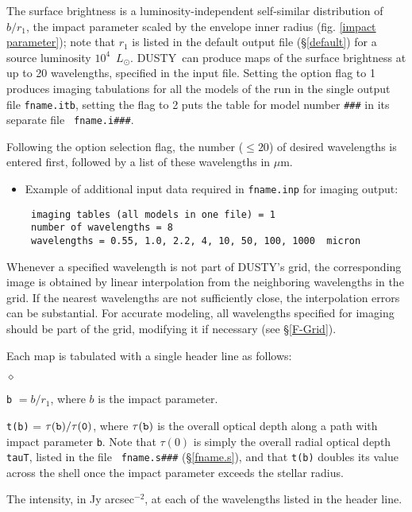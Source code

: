 \documentclass[12pt]{article} \usepackage{epsf}
\def\D  {{\sf DUSTY}}
\def\E#1{\hbox{$10^{#1}$}}
\def\mic    {\hbox{$\mu$m}}
\def\Lo     {\hbox{$L_{\odot}$}}
\begin{document}
The surface brightness is a luminosity-independent self-similar distribution
\cite{IE96a} of $b/r_1$, the impact parameter scaled by the envelope inner
radius (fig. \ref{impact parameter}); note that $r_1$ is listed in the default
output file (\S\ref{default}) for a source luminosity \E4~\Lo. \D\ can produce
maps of the surface brightness at up to 20 wavelengths, specified in the input
file. Setting the option flag to 1 produces imaging tabulations for all the
models of the run in the single output file {\tt fname.itb}, setting the flag
to 2 puts the table for model number {\tt \#\#\#} in its separate file {\tt
fname.i\#\#\#}.

Following the option selection flag, the number ($\le 20$) of desired
wavelengths is entered first, followed by a list of these wavelengths in \mic.

\begin{itemize}
\item Example of additional input data required in {\tt fname.inp} for imaging
output:
\begin{verbatim}
 imaging tables (all models in one file) = 1
 number of wavelengths = 8
 wavelengths = 0.55, 1.0, 2.2, 4, 10, 50, 100, 1000  micron
\end{verbatim}
\end{itemize}
Whenever a specified wavelength is not part of \D's grid, the corresponding
image is obtained by linear interpolation from the neighboring wavelengths in
the grid.  If the nearest wavelengths are not sufficiently close, the
interpolation errors can be substantial. For accurate modeling, all wavelengths
specified for imaging should be part of the grid, modifying it if necessary
(see \S\ref{F-Grid}).

Each map is tabulated with a single header line as follows:
\begin{list}{$\diamond$}{}
\item{\tt b} $= b/r_1$, where $b$ is the impact parameter.
\item
{\tt t(b)} = $\tau(\tt b)/\tau(0)$, where $\tau(\tt b)$ is the overall optical
depth along a path with impact parameter {\tt b}.  Note that $\tau(0)$ is
simply the overall radial optical depth {\tt tauT}, listed in the file {\tt
fname.s\#\#\#} (\S \ref{fname.s}), and that {\tt t(b)} doubles its value across
the shell once the impact parameter exceeds the stellar radius.
\item
The intensity, in Jy arcsec$^{-2}$, at each of the wavelengths listed in the
header line.
\end{list}
\end{document}
